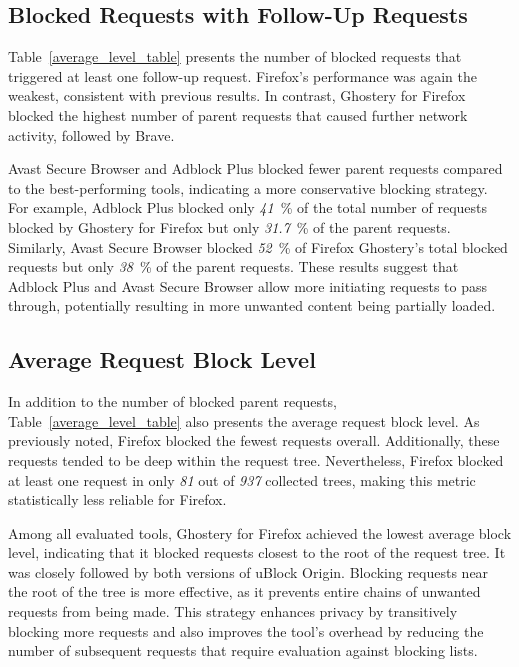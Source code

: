 \subsection{Blocked Requests with Follow-Up Requests}
\label{blocked_requests_with_follow_up}
Table~\ref{average_level_table} presents the number of blocked requests that triggered at least one follow-up request. Firefox's performance was again the weakest, consistent with previous results. In contrast, Ghostery for Firefox blocked the highest number of parent requests that caused further network activity, followed by Brave.

Avast Secure Browser and Adblock Plus blocked fewer parent requests compared to the best-performing tools, indicating a more conservative blocking strategy. For example, Adblock Plus blocked only \emph{41}~\% of the total number of requests blocked by Ghostery for Firefox but only \emph{31.7}~\% of the parent requests. Similarly, Avast Secure Browser blocked \emph{52}~\% of Firefox Ghostery's total blocked requests but only \emph{38}~\% of the parent requests. These results suggest that Adblock Plus and Avast Secure Browser allow more initiating requests to pass through, potentially resulting in more unwanted content being partially loaded.


\subsection{Average Request Block Level}
In addition to the number of blocked parent requests, Table~\ref{average_level_table} also presents the average request block level. As previously noted, Firefox blocked the fewest requests overall. Additionally, these requests tended to be deep within the request tree. Nevertheless, Firefox blocked at least one request in only \emph{81} out of \emph{937} collected trees, making this metric statistically less reliable for Firefox.

Among all evaluated tools, Ghostery for Firefox achieved the lowest average block level, indicating that it blocked requests closest to the root of the request tree. It was closely followed by both versions of uBlock Origin. Blocking requests near the root of the tree is more effective, as it prevents entire chains of unwanted requests from being made. This strategy enhances privacy by transitively blocking more requests and also improves the tool's overhead by reducing the number of subsequent requests that require evaluation against blocking lists.


